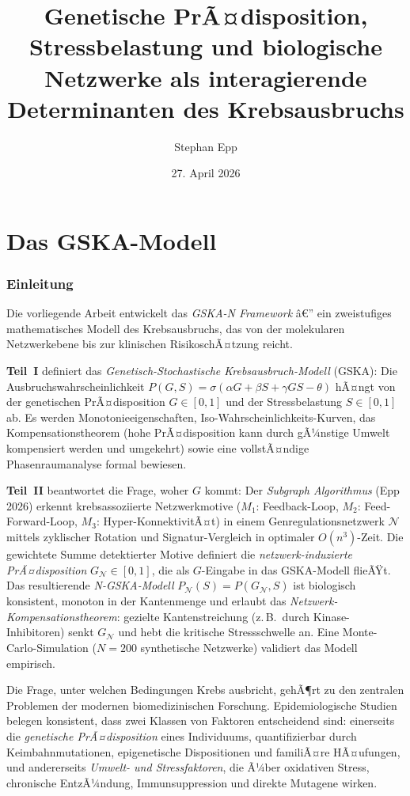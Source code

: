 ﻿\documentclass[12pt, a4paper]{article}
\title{\bfseries Genetische PrÃ¤disposition, Stressbelastung und biologische
    Netzwerke als interagierende Determinanten des Krebsausbruchs}
\date{27. April 2026}
\author{Stephan Epp}
\theoremstyle{definition}
\theoremstyle{remark}
\newcommand{\calN}{\mathcal{N}}
\newcommand{\GN}{G_{\calN}}
\begin{document}
\maketitle
\tableofcontents
\newpage




\part{Das GSKA-Modell}
\label{part:gska}


\section{Einleitung}
\label{sec:einleitung}

Die vorliegende Arbeit entwickelt das \emph{GSKA-N Framework} â€”
ein zweistufiges mathematisches Modell des Krebsausbruchs, das von
der molekularen Netzwerkebene bis zur klinischen RisikoschÃ¤tzung reicht.

\textbf{Teil~I} definiert das \emph{Genetisch-Stochastische Krebsausbruch-Modell}
(GSKA): Die Ausbruchswahrscheinlichkeit $P(G,S) = \sigma(\alpha G + \beta S
+ \gamma GS - \theta)$ hÃ¤ngt von der genetischen PrÃ¤disposition $G \in [0,1]$
und der Stressbelastung $S \in [0,1]$ ab. Es werden Monotonieeigenschaften,
Iso-Wahrscheinlichkeits-Kurven, das Kompensationstheorem (hohe PrÃ¤disposition
kann durch gÃ¼nstige Umwelt kompensiert werden und umgekehrt) sowie eine
vollstÃ¤ndige Phasenraumanalyse formal bewiesen.

\textbf{Teil~II} beantwortet die Frage, woher $G$ kommt: Der
\emph{Subgraph Algorithmus} (Epp 2026) erkennt krebsassoziierte
Netzwerkmotive ($M_1$: Feedback-Loop, $M_2$: Feed-Forward-Loop,
$M_3$: Hyper-KonnektivitÃ¤t) in einem Genregulationsnetzwerk $\calN$
mittels zyklischer Rotation und Signatur-Vergleich in optimaler $O(n^3)$-Zeit.
Die gewichtete Summe detektierter Motive definiert die
\emph{netzwerk-induzierte PrÃ¤disposition} $\GN \in [0,1]$,
die als $G$-Eingabe in das GSKA-Modell flieÃŸt.
Das resultierende \emph{N-GSKA-Modell} $P_\calN(S) = P(\GN, S)$
ist biologisch konsistent, monoton in der Kantenmenge und erlaubt
das \emph{Netzwerk-Kompensationstheorem}: gezielte Kantenstreichung
(z.\,B.\ durch Kinase-Inhibitoren) senkt $\GN$ und hebt die
kritische Stressschwelle an. Eine Monte-Carlo-Simulation
($N=200$ synthetische Netzwerke) validiert das Modell empirisch.

Die Frage, unter welchen Bedingungen Krebs ausbricht, gehÃ¶rt zu den zentralen
Problemen der modernen biomedizinischen Forschung. Epidemiologische Studien
belegen konsistent, dass zwei Klassen von Faktoren entscheidend sind:
einerseits die \emph{genetische PrÃ¤disposition} eines Individuums, quantifizierbar
durch Keimbahnmutationen, epigenetische Dispositionen und familiÃ¤re HÃ¤ufungen,
und andererseits \emph{Umwelt- und Stressfaktoren}, die Ã¼ber oxidativen Stress,
chronische EntzÃ¼ndung, Immunsuppression und direkte Mutagene wirken.
\end{document}
